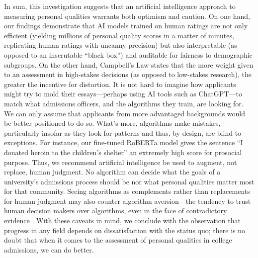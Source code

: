 \documentclass[11pt]{report}
\begin{document}
\begin{mainf}
In sum, this investigation suggests that an artificial intelligence approach to measuring personal qualities warrants both optimism and caution. On one hand, our findings demonstrate that AI models trained on human ratings are not only efficient (yielding millions of personal quality scores in a matter of minutes, replicating human ratings with uncanny precision) but also interpretable (as opposed to an inscrutable ``black box'') and auditable for fairness to demographic subgroups. On the other hand, Campbell’s Law \cite{campbell_assessing_1979} states that the more weight given to an assessment in high-stakes decisions (as opposed to low-stakes research), the greater the incentive for distortion. It is not hard to imagine how applicants might try to mold their essays---perhaps using AI tools such as ChatGPT---to match what admissions officers, and the algorithms they train, are looking for. We can only assume that applicants from more advantaged backgrounds would be better positioned to do so. What's more, algorithms make mistakes, particularly insofar as they look for patterns and thus, by design, are blind to exceptions. For instance, our fine-tuned RoBERTa model gives the sentence ``I donated heroin to the children's shelter'' an extremely high score for prosocial purpose. 
Thus, we recommend artificial intelligence be used to augment, not replace, human judgment. No algorithm can decide what the goals of a university's admissions process should be nor what personal qualities matter most for that community. Seeing algorithms as complements rather than replacements for human judgment may also counter algorithm aversion---the tendency to trust human decision makers over algorithms, even in the face of contradictory evidence \cite{dietvorst_algorithm_2015}. With these caveats in mind, we conclude with the observation that progress in any field depends on dissatisfaction with the status quo; there is no doubt that when it comes to the assessment of personal qualities in college admissions, we can do better.


\end{mainf}
\end{document}
